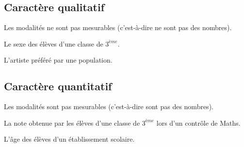 \documentclass[12pt,a4paper]{report}
\begin{document}
\subsection{Caractère qualitatif}
Les modalités ne sont pas mesurables (c'est-à-dire ne sont pas des nombres).

\begin{exemples}
\item Le sexe des élèves d'une classe de $3^{ème}$.
\item L'artiste préféré par une population.
\end{exemples}

\subsection{Caractère quantitatif}
Les modalités sont pas mesurables (c'est-à-dire sont pas des nombres).

\begin{exemples}
\item La note obtenue par les élèves d'une classe de $3^{ème}$ lors d'un contrôle de Maths.
\item L'âge des élèves d'un établissement scolaire.
\end{exemples}

\newpage
\newcommand{\A}{Black-T}
\newcommand{\B}{Santrinos}
\newcommand{\C}{Almok}
\newcommand{\D}{Dian'uella}
\newcommand{\E}{Etane}
\end{document}

